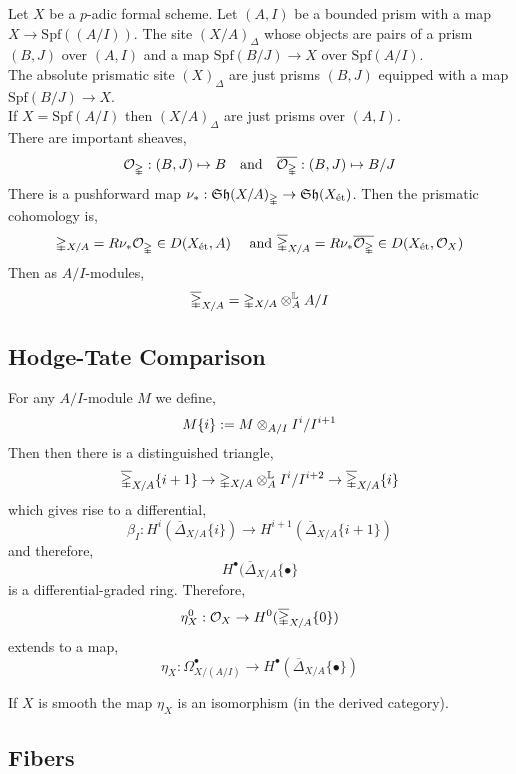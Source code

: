 \documentclass[12pt]{article}
\begin{document}
\newcommand{\Spf}[1]{\mathrm{Spf}\left( #1 \right)}
\newcommand{\pris}{\mathbb{\Delta}}
\newcommand{\barpris}{\overline{\pris}}
\newcommand{\derot}{\ot^{\mathbb{L}}}

Let $X$ be a $p$-adic formal scheme. Let $(A, I)$ be a bounded prism with a map $X \to \Spf{(A/I)}$. The site $(X/A)_{\pris}$ whose objects are pairs of a prism $(B, J)$ over $(A,I)$ and a map $\Spf{B/J} \to X$ over $\Spf{A/I}$.
\bigskip\\
The absolute prismatic site $(X)_{\pris}$ are just prisms $(B, J)$ equipped with a map $\Spf{B/J} \to X$.
\bigskip\\
If $X = \Spf{A/I}$ then $(X/A)_{\pris}$ are just prisms over $(A,I)$.
\bigskip\\
There are important sheaves,
\[ \struct{\pris} : (B, J) \mapsto B \quad \text{and} \quad \overline{\struct{\pris}} : (B, J) \mapsto B/J \]
There is a pushforward map $\nu_* : \Sh{(X/A)_{\pris}} \to \Sh{(X_{\et})}$. Then the prismatic cohomology is,
\[ \pris_{X/A} = R \nu_* \struct{\pris} \in D(X_{\et}, A) \quad \text{ and } \overline{\pris}_{X/A} = R \nu_* \overline{\struct{\pris}} \in D(X_{\et}, \struct{X}) \]
Then as $A/I$-modules,
\[ \overline{\pris}_{X/A} = \pris_{X/A} \ot^{\mathbb{L}}_A A / I \]

\subsection{Hodge-Tate Comparison}

For any $A / I$-module $M$ we define,
\[ M \{ i \} := M \otimes_{A/I} I^i / I^{i+1} \]
Then then there is a distinguished triangle,
\[ \overline{\pris}_{X/A} \{ i + 1 \} \to \pris_{X/A} \derot_A I^i / I^{i+2} \to \overline{\pris}_{X/A} \{ i \} \]
which gives rise to a differential,
\[ \beta_I : H^i(\barpris_{X/A} \{ i \}) \to H^{i+1}(\barpris_{X/A} \{ i+1 \}) \]
and therefore,
\[ H^\bullet(\barpris_{X/A} \{ \bullet \} \] is a differential-graded ring. Therefore,
\[ \eta^0_X : \struct{X} \to H^0(\barpris_{X/A} \{ 0 \}) \]
extends to a map,
\[ \eta_X : \Omega^\bullet_{X/(A/I)} \to H^\bullet(\barpris_{X/A} \{ \bullet \}) \]

\begin{theorem}[Comparison]
If $X$ is smooth the map $\eta_X$ is an isomorphism (in the derived category). 
\end{theorem}

\subsection{Fibers}
\end{document}
